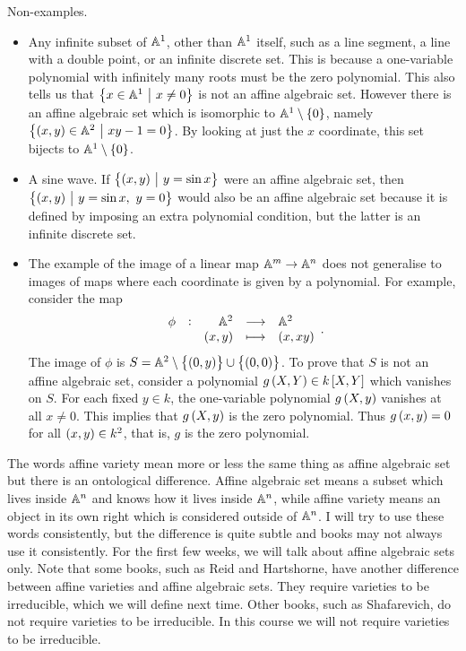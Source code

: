 \begin{example*}
Non-examples.
\begin{itemize}
\item Any infinite subset of $ \AA^1 $, other than $ \AA^1 $ itself, such as a line segment, a line with a double point, or an infinite discrete set. This is because a one-variable polynomial with infinitely many roots must be the zero polynomial. This also tells us that $ \cbr{x \in \AA^1 \st x \ne 0} $ is not an affine algebraic set. However there is an affine algebraic set which is isomorphic to $ \AA^1 \setminus \cbr{0} $, namely $ \cbr{\br{x, y} \in \AA^2 \st xy - 1 = 0} $. By looking at just the $ x $ coordinate, this set bijects to $ \AA^1 \setminus \cbr{0} $.
\item A sine wave. If $ \cbr{\br{x, y} \st y = \sin x} $ were an affine algebraic set, then $ \cbr{\br{x, y} \st y = \sin x, \ y = 0} $ would also be an affine algebraic set because it is defined by imposing an extra polynomial condition, but the latter is an infinite discrete set.
\item The example of the image of a linear map $ \AA^m \to \AA^n $ does not generalise to images of maps where each coordinate is given by a polynomial. For example, consider the map
$$ \function[\phi]{\AA^2}{\AA^2}{\br{x, y}}{\br{x, xy}}. $$
The image of $ \phi $ is $ S = \AA^2 \setminus \cbr{\br{0, y}} \cup \cbr{\br{0, 0}} $. To prove that $ S $ is not an affine algebraic set, consider a polynomial $ g\br{X, Y} \in k\sbr{X, Y} $ which vanishes on $ S $. For each fixed $ y \in k $, the one-variable polynomial $ g\br{X, y} $ vanishes at all $ x \ne 0 $. This implies that $ g\br{X, y} $ is the zero polynomial. Thus $ g\br{x, y} = 0 $ for all $ \br{x, y} \in k^2 $, that is, $ g $ is the zero polynomial.
\end{itemize}
\end{example*}

\begin{remark}
The words affine variety mean more or less the same thing as affine algebraic set but there is an ontological difference. Affine algebraic set means a subset which lives inside $ \AA^n $ and knows how it lives inside $ \AA^n $, while affine variety means an object in its own right which is considered outside of $ \AA^n $. I will try to use these words consistently, but the difference is quite subtle and books may not always use it consistently. For the first few weeks, we will talk about affine algebraic sets only. Note that some books, such as Reid and Hartshorne, have another difference between affine varieties and affine algebraic sets. They require varieties to be irreducible, which we will define next time. Other books, such as Shafarevich, do not require varieties to be irreducible. In this course we will not require varieties to be irreducible.
\end{remark}

